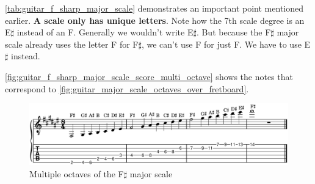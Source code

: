 \autoref{tab:guitar_f_sharp_major_scale} demonstrates an important point mentioned earlier. \textbf{A scale only has unique letters}. Note how the 7th scale degree is an E$\sharp$ instead of an F. Generally we wouldn't write E$\sharp$. But because the F$\sharp$ major scale already uses the letter F for F$\sharp$, we can't use F for just F. We have to use E$\sharp$ instead.

\autoref{fig:guitar_f_sharp_major_scale_score_multi_octave} shows the notes that correspond to \autoref{fig:guitar_major_scale_octaves_over_fretboard}.

\begin{figure}[h]
	\centering
	\includegraphics[width=\textwidth]{../../MuseScore/Guitar/GuitarFSharpMajorMultiOctave.png}
	\caption{Multiple octaves of the F$\sharp$ major scale}
	\label{fig:guitar_f_sharp_major_scale_score_multi_octave}
\end{figure}

\newpage

